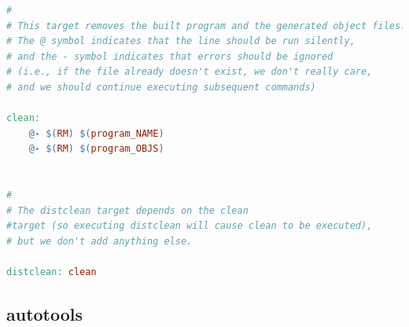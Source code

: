 \documentclass[a4paper,12pt,twoside]{book}
\begin{document}
\begin{itemize}
\begin{lstlisting}[frame=single,  basicstyle=\small, language=make]
#
# This target removes the built program and the generated object files. 
# The @ symbol indicates that the line should be run silently, 
# and the - symbol indicates that errors should be ignored 
# (i.e., if the file already doesn't exist, we don't really care, 
# and we should continue executing subsequent commands)

clean:
    @- $(RM) $(program_NAME)
    @- $(RM) $(program_OBJS)


#
# The distclean target depends on the clean
#target (so executing distclean will cause clean to be executed), 
# but we don't add anything else.

distclean: clean
\end{lstlisting}


\end{itemize}
\subsection{autotools}
\end{document}
